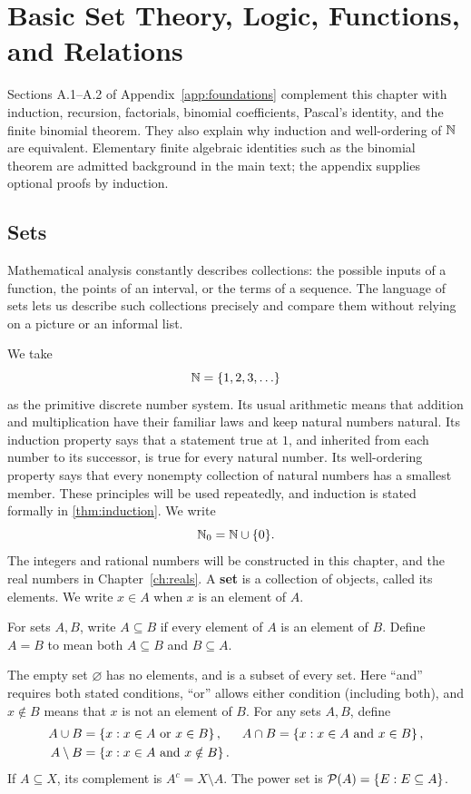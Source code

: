 \chapter{Basic Set Theory, Logic, Functions, and Relations}
\label{ch:foundations}

Sections A.1--A.2 of Appendix~\ref{app:foundations} complement this chapter
with induction, recursion, factorials, binomial coefficients, Pascal's
identity, and the finite binomial theorem. They also explain why induction
and well-ordering of $\mathbb{N}$ are equivalent. Elementary finite algebraic
identities such as the binomial theorem are admitted background in the main
text; the appendix supplies optional proofs by induction.

\section{Sets}

Mathematical analysis constantly describes collections: the possible inputs
of a function, the points of an interval, or the terms of a sequence.  The
language of sets lets us describe such collections precisely and compare
them without relying on a picture or an informal list.

We take
\[
\mathbb{N}=\{1,2,3,\ldots\}
\]
as the primitive discrete number system. Its usual arithmetic means that
addition and multiplication have their familiar laws and keep natural
numbers natural. Its induction property says that a statement true at $1$, and inherited from each number to its successor, is true for every
natural number. Its well-ordering property says that every nonempty
collection of natural numbers has a smallest member. These principles will
be used repeatedly, and induction is stated formally in
\cref{thm:induction}. We write
\[
\mathbb{N}_0=\mathbb{N}\cup\{0\}.
\]
The integers and rational numbers will be constructed in this chapter, and
the real numbers in Chapter~\ref{ch:reals}. A \textbf{set} is a collection of
objects, called its elements. We write $x\in A$ when $x$ is an element of
$A$.

\begin{definition}
For sets $A,B$, write $A\subseteq B$ if every element of $A$ is an element of $B$. Define $A=B$ to mean both $A\subseteq B$ and $B\subseteq A$.
\end{definition}

The empty set $\varnothing$ has no elements, and is a subset of every set.
Here ``and'' requires both stated conditions, ``or'' allows either condition
(including both), and $x\notin B$ means that $x$ is not an element of $B$.
For any sets $A,B$, define
\begin{align*}
A\cup B&=\left\{x:x\in A\text{ or }x\in B\right\}, &
A\cap B&=\left\{x:x\in A\text{ and }x\in B\right\},\\
A\setminus B&=\left\{x:x\in A\text{ and }x\notin B\right\}.
\end{align*}
If $A\subseteq X$, its complement is $A^c=X\setminus A$. The power set is $\mathcal P(A)=\left\{E:E\subseteq A\right\}$.

